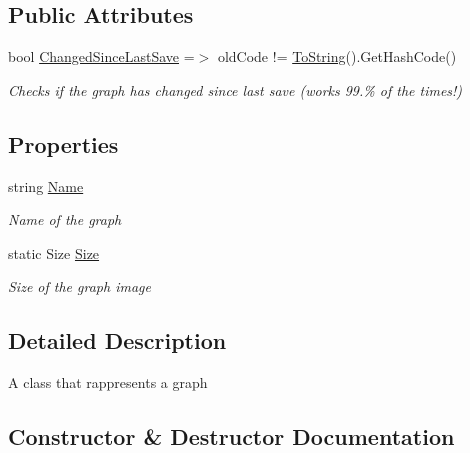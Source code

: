 \subsection*{Public Attributes}
\begin{DoxyCompactItemize}
\item 
bool \hyperlink{class_graph_1_1_graph_a0daa42ad862bce4e14dca2652b565dc9}{Changed\+Since\+Last\+Save} =$>$ old\+Code != \hyperlink{class_graph_1_1_graph_a156e417443003071243e2a22ba0a1533}{To\+String}().Get\+Hash\+Code()
\begin{DoxyCompactList}\small\item\em Checks if the graph has changed since last save (works 99.\% of the times!) \end{DoxyCompactList}\end{DoxyCompactItemize}
\subsection*{Properties}
\begin{DoxyCompactItemize}
\item 
string \hyperlink{class_graph_1_1_graph_a2635cdb256ccefb545cf402bd52a3f80}{Name}
\begin{DoxyCompactList}\small\item\em Name of the graph \end{DoxyCompactList}\item 
static Size \hyperlink{class_graph_1_1_graph_ace6128caf64c731423b0ccd106f3ada6}{Size}
\begin{DoxyCompactList}\small\item\em Size of the graph image \end{DoxyCompactList}\end{DoxyCompactItemize}


\subsection{Detailed Description}
A class that rappresents a graph 



\subsection{Constructor \& Destructor Documentation}
\mbox{\label{class_graph_1_1_graph_a30ae09ae4861f50e9e2b52d4e5628335}} 
